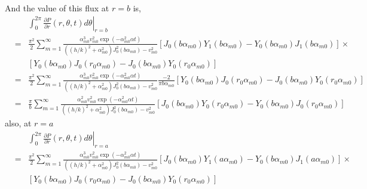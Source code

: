 \documentclass{article}
\begin{document}
%
And the value of this flux at $r=b$ is,
%
\begin{eqnarray}
    & & \left.
    \int_0^{2\pi}\frac{\partial P}{\partial r}(r, \theta, t)d\theta
    \right|_{r=b}
\nonumber\\
    &=& \frac{\pi^2}{2} \sum_{m=1}^{\infty}
    \frac{\alpha_{m0}^3 v_{m0}^2 \exp(-\alpha_{m0}^2\alpha t)}
         {((h/k)^2 + \alpha_{m0}^2)J_0^2(b\alpha_{m0}) - v_{m0}^2}
    \left[
        J_0(b\alpha_{m0})Y_1(b\alpha_{m0}) - Y_0(b\alpha_{m0})J_1(b\alpha_{m0})
    \right] \times
\nonumber\\
    & & \left[
        Y_0(b\alpha_{m0}) J_0(r_0\alpha_{m0}) - J_0(b\alpha_{m0}) Y_0(r_0\alpha_{m0})
    \right]
\nonumber\\
    &=& \frac{\pi^2}{2} \sum_{m=1}^{\infty}
    \frac{\alpha_{m0}^3 v_{m0}^2 \exp(-\alpha_{m0}^2\alpha t)}
         {((h/k)^2 + \alpha_{m0}^2)J_0^2(b\alpha_{m0}) - v_{m0}^2}
    \frac{-2}{\pi b\alpha_{m0}}
    \left[
        Y_0(b\alpha_{m0}) J_0(r_0\alpha_{m0}) - J_0(b\alpha_{m0}) Y_0(r_0\alpha_{m0})
    \right]
\nonumber\\
    &=& \frac{\pi}{b} \sum_{m=1}^{\infty}
    \frac{\alpha_{m0}^2 v_{m0}^2 \exp(-\alpha_{m0}^2\alpha t)}
         {((h/k)^2 + \alpha_{m0}^2)J_0^2(b\alpha_{m0}) - v_{m0}^2}
    \left[
        J_0(b\alpha_{m0}) Y_0(r_0\alpha_{m0}) - Y_0(b\alpha_{m0}) J_0(r_0\alpha_{m0})
    \right]
\end{eqnarray}
%
also, at $r=a$
%
\begin{eqnarray}
    & & \left.
    \int_0^{2\pi}\frac{\partial P}{\partial r}(r, \theta, t)d\theta
    \right|_{r=a}
\nonumber\\
    &=& \frac{\pi^2}{2} \sum_{m=1}^{\infty}
    \frac{\alpha_{m0}^3 v_{m0}^2 \exp(-\alpha_{m0}^2\alpha t)}
         {((h/k)^2 + \alpha_{m0}^2)J_0^2(b\alpha_{m0}) - v_{m0}^2}
    \left[
        J_0(b\alpha_{m0})Y_1(a\alpha_{m0}) - Y_0(b\alpha_{m0})J_1(a\alpha_{m0})
    \right] \times
\nonumber\\
    & & \left[
        Y_0(b\alpha_{m0}) J_0(r_0\alpha_{m0}) - J_0(b\alpha_{m0}) Y_0(r_0\alpha_{m0})
    \right]
\end{eqnarray}
\end{document}
